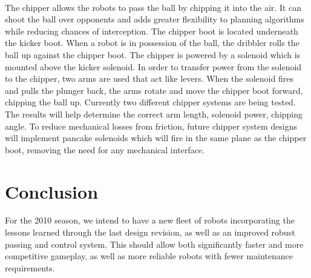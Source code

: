 \documentclass{llncs}
\begin{document}
\paragraph{}
The chipper allows the robots to pass the ball by chipping it into the air. It can shoot the ball over opponents and adds greater flexibility to planning algorithms while reducing chances of interception. The chipper boot is located underneath the kicker boot. When a robot is in possession of the ball, the dribbler rolls the ball up against the chipper boot. The chipper is powered by a solenoid which is mounted above the kicker solenoid. In order to transfer power from the solenoid to the chipper, two arms are used that act like levers. When the solenoid fires and pulls the plunger back, the arms rotate and move the chipper
boot forward, chipping the ball up. Currently two different chipper systems are being tested. The results will help determine the correct arm length, solenoid power, chipping angle. To reduce mechanical losses from friction, future chipper system designs will implement pancake solenoids which will fire in the same plane as the chipper boot, removing the need for any mechanical interface.



\section{Conclusion}
For the 2010 season, we intend to have a new fleet of robots incorporating the lessons learned through the last design revision, as well as an improved robust passing and control system.  This should allow both significantly faster and more competitive gameplay, as well as more reliable robots with fewer maintenance requirements.  



\end{document}
